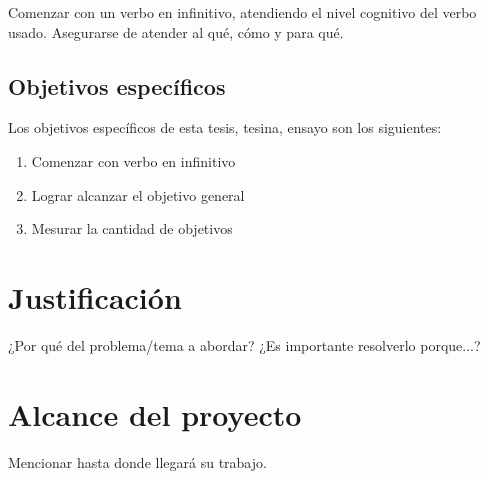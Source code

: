 Comenzar con un verbo en infinitivo, atendiendo el nivel cognitivo del verbo usado. Asegurarse de atender al qué, cómo y para qué.

\subsection{Objetivos específicos}

Los objetivos específicos de esta tesis, tesina, ensayo son los siguientes:
\begin{enumerate}

\item Comenzar con verbo en infinitivo
\item Lograr alcanzar el objetivo general
\item Mesurar la cantidad de objetivos
 
\end{enumerate}
 
\section{Justificación}

¿Por qué del problema/tema a abordar? ¿Es importante resolverlo porque...?

\section{Alcance del proyecto}

Mencionar hasta donde llegará su trabajo.

